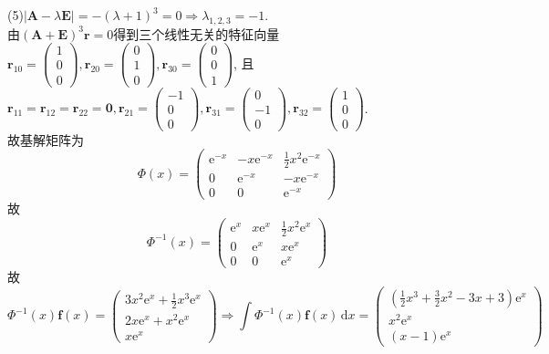 \documentclass[titlepage,11pt,a4paper,twoside]{report}
\makeatletter
\newcommand\diff{\,\mathrm{d}}
\newcommand\e{\mathrm{e}}
\newcommand\bmitPhi{\bm{\varPhi}}
\newenvironment{solve}{\par
	\pushQED{\qed}%
	\normalfont \topsep1\p@\@plus6\p@\relax
	\trivlist
	\item\relax
	{\hspace*{\parindent}{\heiti 解}\@addpunct{:}}\hspace\labelsep\ignorespaces
}{%
	\popQED\endtrivlist\@endpefalse
}
\makeatother
\begin{document}
\begin{solve}
(5)$|\bm{A}-\lambda\bm{E}|=-(\lambda+1)^3=0\Rightarrow\lambda_{1,2,3}=-1$.\\
由$(\bm{A}+\bm{E})^3\bm{r}=0$得到三个线性无关的特征向量$\bm{r}_{10}=\begin{pmatrix}1\\0\\0\end{pmatrix},\bm{r}_{20}=\begin{pmatrix}0\\1\\0\end{pmatrix},\bm{r}_{30}=\begin{pmatrix}0\\0\\1\end{pmatrix}$, 且$\bm{r}_{11}=\bm{r}_{12}=\bm{r}_{22}=\bm{0},\bm{r}_{21}=\begin{pmatrix}-1\\0\\0\end{pmatrix},\bm{r}_{31}=\begin{pmatrix}0\\-1\\0\end{pmatrix},\bm{r}_{32}=\begin{pmatrix}1\\0\\0\end{pmatrix}$.\\
故基解矩阵为
\[\bmitPhi(x)=\begin{pmatrix}\e^{-x}&-x\e^{-x}&\frac{1}{2}x^2\e^{-x}\\0&\e^{-x}&-x\e^{-x}\\0&0&\e^{-x}\end{pmatrix}\]
故\[\bmitPhi^{-1}(x)=\begin{pmatrix}\e^x&x\e^x&\frac{1}{2}x^2\e^x\\0&\e^x&x\e^x\\0&0&\e^x\end{pmatrix}\]
故\[\bmitPhi^{-1}(x)\bm{f}(x)=\begin{pmatrix}3x^2\e^x+\frac{1}{2}x^3\e^x\\2x\e^x+x^2\e^x\\x\e^x\end{pmatrix}\Rightarrow\int\bmitPhi^{-1}(x)\bm{f}(x)\diff x=\begin{pmatrix}\left(\frac{1}{2}x^3+\frac{3}{2}x^2-3x+3\right)\e^x\\x^2\e^x\\(x-1)\e^x\end{pmatrix}\]

\end{solve}
\end{document}
